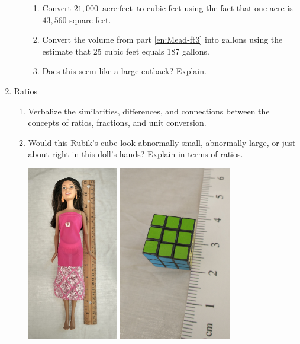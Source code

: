 \begin{enumerate}
\begin{enumerate}
	\begin{enumerate}
		\item \label{en:Mead-ft3}Convert $21,000$ $\text{acre}\cdot\text{feet}$ to cubic feet using the fact that one acre is $43,560$ square feet.
		\item Convert the volume from part \ref{en:Mead-ft3} into gallons using the estimate that 25 cubic feet equals 187 gallons.
		\item Does this seem like a large cutback? Explain.
	\end{enumerate}
\end{enumerate}

\item Ratios
\begin{enumerate}
\item Verbalize the similarities, differences, and connections between the concepts of ratios, fractions, and unit conversion.
\item Would this Rubik's cube look abnormally small, abnormally large, or just about right in this doll's hands? Explain in terms of ratios.
\begin{center}
\includegraphics[height=3in]{images/doll} \includegraphics[height=3in]{images/RubiksCube}

\end{center}
\end{enumerate}
\end{enumerate}
